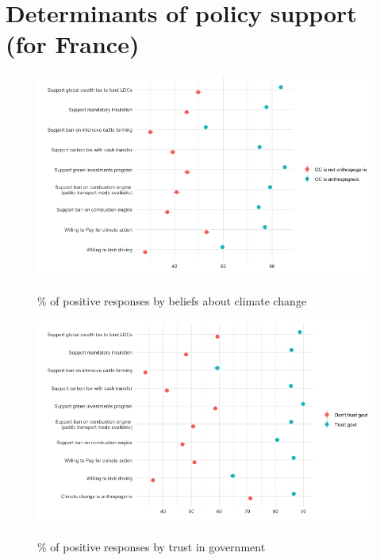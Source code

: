 	
\section{Determinants of policy support (for France)} %

\begin{frame}{}%
	\begin{figure}[h!]
	\caption{\% of positive responses by beliefs about climate change} %
	\includegraphics[width=.7\paperwidth]{../figures/country_comparison/main_var_by_country_anthropogenic_all.png} \\
	\end{figure}
\end{frame}
	
	\begin{frame}{}%
	\begin{figure}[h!]
	\caption{\% of positive responses by trust in government}
	\includegraphics[width=.7\paperwidth]{../figures/country_comparison/main_var_by_country_trust_govt_all.png} \\
	\end{figure}
	\end{frame}
	
